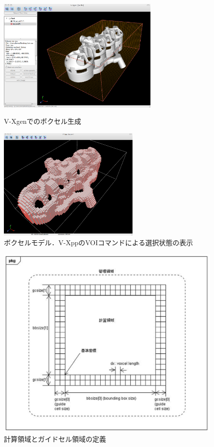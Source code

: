 \begin{enumerate}
\begin{figure}[htbp]
\begin{minipage}{.48\textwidth}
\begin{center}
\includegraphics[width=8cm,clip]{voxelize.eps}
\end{center}
\caption{V-Xgenでのボクセル生成}
\label{fig:V-Xgen voxelize}
\end{minipage} \hfill
\begin{minipage}{.48\textwidth}
\begin{center}
\includegraphics[width=7cm,clip]{WJ_voxel.eps}
\end{center}
\caption{ボクセルモデル．V-XppのVOIコマンドによる選択状態の表示}
\label{fig:V-Xpp voxel}
\end{minipage}
\end{figure}

\begin{figure}[htdp]
\begin{center}
\includegraphics[width=12cm,clip]{clip006.eps}
\caption{計算領域とガイドセル領域の定義}
\label{fig:cal. region}
\end{center}
\end{figure}



\end{enumerate}
